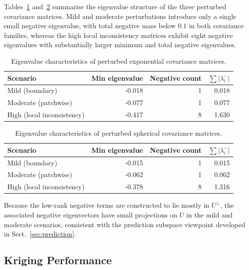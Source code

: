 \documentclass[smallextended]{svjour3}
\newcommand{\1}{\mathbf{1}}
\begin{document}
Tables~\ref{tab:exp_eigenvalues} and~\ref{tab:sph_eigenvalues} summarise the eigenvalue structure of the three perturbed covariance matrices. Mild and moderate perturbations introduce only a single small negative eigenvalue, with total negative mass below $0.1$ in both covariance families, whereas the high local inconsistency matrices exhibit eight negative eigenvalues with substantially larger minimum and total negative eigenvalues.

\begin{table}[htbp]
	\centering
	\caption{Eigenvalue characteristics of perturbed exponential covariance matrices.}
	\label{tab:exp_eigenvalues}
	\begin{tabular}{lrrr}
		\hline
		Scenario & Min eigenvalue & Negative count & $\sum |\lambda_i^-|$ \\
		\hline
		Mild (boundary) & -0.018 & 1 & 0.018 \\
		Moderate (patchwise) & -0.077 & 1 & 0.077 \\
		High (local inconsistency) & -0.417 & 8 & 1.630 \\
		\hline
	\end{tabular}
\end{table}

\begin{table}[htbp]
	\centering
	\caption{Eigenvalue characteristics of perturbed spherical covariance matrices.}
	\label{tab:sph_eigenvalues}
	\begin{tabular}{lrrr}
		\hline
		Scenario & Min eigenvalue & Negative count & $\sum |\lambda_i^-|$ \\
		\hline
		Mild (boundary) & -0.015 & 1 & 0.015 \\
		Moderate (patchwise) & -0.062 & 1 & 0.062 \\
		High (local inconsistency) & -0.378 & 8 & 1.316 \\
		\hline
	\end{tabular}
\end{table}

Because the low-rank negative terms are constructed to lie mostly in $U^\perp$, the associated negative eigenvectors have small projections on $U$ in the mild and moderate scenarios, consistent with the prediction subspace viewpoint developed in Sect.~\ref{sec:prediction}.

\subsection{Kriging Performance}
\end{document}
